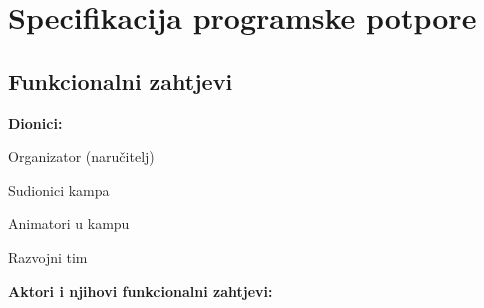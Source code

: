 \chapter{Specifikacija programske potpore}

\section{Funkcionalni zahtjevi}




\noindent \textbf{Dionici:}

\begin{packed_enum}

	\item Organizator (naručitelj)
	\item Sudionici kampa
	\item Animatori u kampu
	\item Razvojni tim

\end{packed_enum}
\vspace{10mm} %
\noindent \textbf{Aktori i njihovi funkcionalni zahtjevi:}


